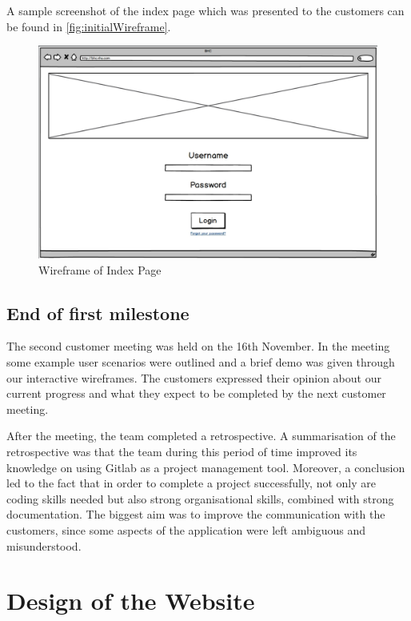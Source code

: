 \documentclass{l3proj}
\begin{document}
A sample screenshot of the index page which was presented to the customers can be found in \autoref{fig:initialWireframe}.

\begin{figure}[h]
\centerline{\includegraphics[width=\textwidth, height=\textheight, keepaspectratio]{wireframe.png}}
\caption{Wireframe of Index Page}
\label{fig:initialWireframe}
\end{figure}



\subsection{End of first milestone}
\label{sec:milestone1}

The second customer meeting was held on the 16th November. In the meeting some example user scenarios were outlined and a brief demo was given through our interactive wireframes. The customers expressed their opinion about our current progress and what they expect to be completed by the next customer meeting.

After the meeting, the team completed a retrospective. A summarisation of the retrospective was that the team during this period of time improved its knowledge on using Gitlab as a project management tool. Moreover, a conclusion led to the fact that in order to complete a project successfully, not only are coding skills needed but also strong organisational skills, combined with strong documentation. The biggest aim was to improve the communication with the customers, since some aspects of the application were left ambiguous and misunderstood.


\section{Design of the Website}
\label{sec:design}
\end{document}
